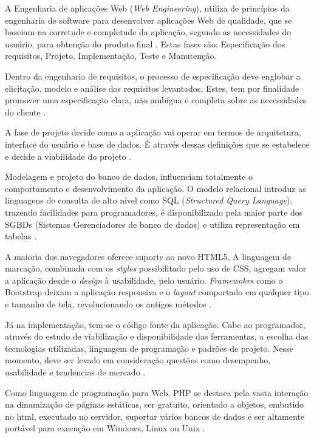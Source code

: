 A Engenharia de aplicações Web (\textit{Web Engineering}), utiliza de princípios da engenharia de software para desenvolver aplicações Web de qualidade, que se baseiam na corretude e completude  da aplicação, segundo as necessidades do usuário, para obtenção do produto final \cite{pressman2011engenharia}. Estas fases são: Especificação dos requisitos, Projeto, Implementação, Teste e Manutenção.

Dentro da engenharia de requisitos, o processo de especificação deve englobar a elicitação, modelo e análise dos requisitos levantados. Estes, tem por finalidade promover uma especificação clara, não ambígua e completa sobre as necessidades do cliente \cite{koscianski2007qualidade}.

A fase de projeto decide como a aplicação vai operar em termos de arquitetura, interface do usuário e base de dados. É através dessas definições que se estabelece e decide a viabilidade do projeto \cite{pressman2011engenharia}.

Modelagem e projeto do banco de dados, influenciam totalmente o comportamento e desenvolvimento da aplicação. O modelo relacional introduz as linguagens de consulta de alto nível como SQL (\textit{Structured Query Language}), trazendo facilidades para programadores, é disponibilizado pela maior parte dos SGBDs (Sistemas Gerenciadores de banco de dados) e utiliza representação em tabelas \cite{elmasri2005sistemas}.

A maioria dos navegadores oferece suporte ao novo HTML5. A linguagem de marcação, combinada com os \textit{styles} possibilitado pelo uso de CSS, agregam valor a aplicação desde o \textit{design} à usabilidade, pelo usuário. \textit{Framewokrs} como o Bootstrap deixam a aplicação responsiva e o \textit{layout} comportado em qualquer tipo e tamanho de tela, revolucionando os antigos métodos \cite{kim2013responsive}.

Já na implementação, tem-se o código fonte da aplicação. Cabe ao programador, através do estudo de viabilização e disponibilidade das ferramentas, a escolha das tecnologias utilizadas, linguagem de programação e padrões de projeto. Nesse momento, deve ser levado em consideração questões como desempenho, usabilidade  e tendencias de mercado \cite{dantas2002suporte}.

Como linguagem de programação para Web, PHP se destaca pela vasta interação na dinamização de páginas estáticas, ser gratuito, orientado a objetos, embutido no html, executado no servidor, suportar vários bancos de dados e ser altamente portável para execução em Windows, Linux ou Unix \cite{niederauer2004desenvolvendo}.



